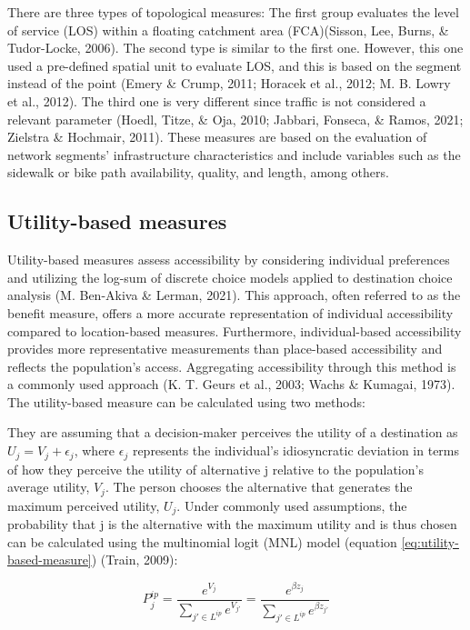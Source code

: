 \documentclass[
11pt, %
oneside, %
english, %
singlespacing, %
]{macthesis} %
\begin{document}
There are three types of topological measures: The first group evaluates the level of service (LOS) within a floating catchment area (FCA)(Sisson, Lee, Burns, \& Tudor-Locke, 2006). The second type is similar to the first one. However, this one used a pre-defined spatial unit to evaluate LOS, and this is based on the segment instead of the point (Emery \& Crump, 2011; Horacek et al., 2012; M. B. Lowry et al., 2012). The third one is very different since traffic is not considered a relevant parameter (Hoedl, Titze, \& Oja, 2010; Jabbari, Fonseca, \& Ramos, 2021; Zielstra \& Hochmair, 2011). These measures are based on the evaluation of network segments' infrastructure characteristics and include variables such as the sidewalk or bike path availability, quality, and length, among others.

\subsection{Utility-based measures}\label{utility-based-measures}

Utility-based measures assess accessibility by considering individual preferences and utilizing the log-sum of discrete choice models applied to destination choice analysis (M. Ben-Akiva \& Lerman, 2021). This approach, often referred to as the benefit measure, offers a more accurate representation of individual accessibility compared to location-based measures. Furthermore, individual-based accessibility provides more representative measurements than place-based accessibility and reflects the population's access. Aggregating accessibility through this method is a commonly used approach (K. T. Geurs et al., 2003; Wachs \& Kumagai, 1973). The utility-based measure can be calculated using two methods:

They are assuming that a decision-maker perceives the utility of a destination as \(U_j = V_j + \epsilon_j\), where \(\epsilon_j\) represents the individual's idiosyncratic deviation in terms of how they perceive the utility of alternative j relative to the population's average utility, \(V_j\). The person chooses the alternative that generates the maximum perceived utility, \(U_j\). Under commonly used assumptions, the probability that j is the alternative with the maximum utility and is thus chosen can be calculated using the multinomial logit (MNL) model (equation \ref{eq:utility-based-measure}) (Train, 2009):

\begin{equation}
P_j^{ip} = \frac{e^{V_j}}{\sum_{j' \in L^{ip}} e^{V_{j'}}} = \frac{e^{\beta z_j}}{\sum_{j' \in L^{ip}} e^{\beta z_{j'}}}
\label{eq:utility-based-measure}
\end{equation}
\end{document}
